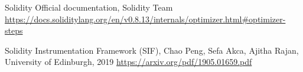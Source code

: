 
\begin{thebibliography}{9}
     Solidity Official documentation, Solidity Team \url{https://docs.soliditylang.org/en/v0.8.13/internals/optimizer.html#optimizer-steps}
    
     Solidity Instrumentation Framework (SIF), Chao Peng, Sefa Akca, Ajitha Rajan, University of Edinburgh, 2019 \url{https://arxiv.org/pdf/1905.01659.pdf}
\end{thebibliography}
